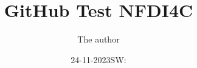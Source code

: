 \documentclass[11pt]{book}
\title{GitHub Test NFDI4C}
\author{The author}
\date{24-11-2023SW:}
\begin{document}
\maketitle
\def\title#1{\chapter{#1}}
\tableofcontents

        
        
        
        
        
        
\end{document}
